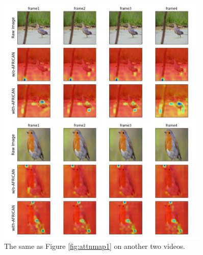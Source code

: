 \begin{figure}[ht]
    \centering
    \includegraphics[width=0.9\textwidth]{assets/charts/4_5_AttentionMaps_3}
    \caption[Attention Map 3 (Good examples)]{The same as Figure \ref{fig:attnmap1} on another two videos.}
    \label{fig:attnmap3}
\end{figure}

